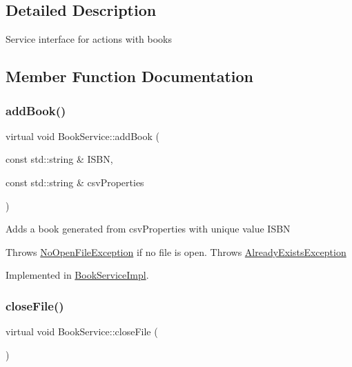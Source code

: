 \subsection{Detailed Description}
Service interface for actions with books 

\subsection{Member Function Documentation}
\mbox{\label{classBookService_a10744fb09191f0d2811d766aa1124931}} 
\subsubsection{\texorpdfstring{add\+Book()}{addBook()}}
{\footnotesize\ttfamily virtual void Book\+Service\+::add\+Book (\begin{DoxyParamCaption}\item[{const std\+::string \&}]{I\+S\+BN,  }\item[{const std\+::string \&}]{csv\+Properties }\end{DoxyParamCaption})\hspace{0.3cm}{\ttfamily [pure virtual]}}

Adds a book generated from csv\+Properties with unique value I\+S\+BN

Throws \hyperlink{structNoOpenFileException}{No\+Open\+File\+Exception} if no file is open. Throws \hyperlink{classAlreadyExistsException}{Already\+Exists\+Exception} 

Implemented in \hyperlink{classBookServiceImpl_a990c823f559356c2a6290b9acc9eeb91}{Book\+Service\+Impl}.

\mbox{\label{classBookService_af002fdac384bbaa9d6db2de419163c82}} 
\subsubsection{\texorpdfstring{close\+File()}{closeFile()}}
{\footnotesize\ttfamily virtual void Book\+Service\+::close\+File (\begin{DoxyParamCaption}{ }\end{DoxyParamCaption})\hspace{0.3cm}{\ttfamily [pure virtual]}}

